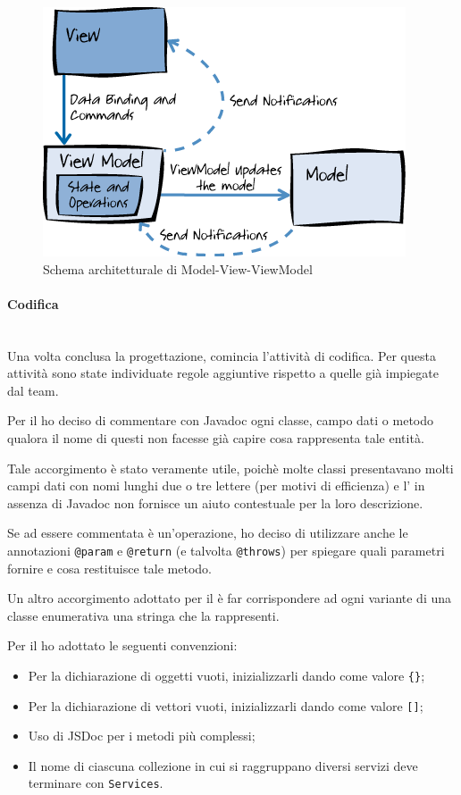 \begin{figure}[H]%
\centering
\includegraphics[width=.7\columnwidth]{immagini/mvvm}
\caption{Schema architetturale di Model-View-ViewModel}
\label{fig:mvvm}%
\end{figure}

\paragraph{Codifica} \mbox{} \\

Una volta conclusa la progettazione, comincia l'attività di codifica. Per
questa attività sono state individuate regole aggiuntive rispetto a quelle già
impiegate dal team.

Per il \BKEND{} ho deciso di commentare con Javadoc ogni classe, campo dati o
metodo qualora il nome di questi non facesse già capire cosa rappresenta tale
entità.

Tale accorgimento è stato veramente utile, poichè molte classi presentavano
molti campi dati con nomi lunghi due o tre lettere (per motivi di efficienza)
e l' in assenza di Javadoc non fornisce un aiuto contestuale per la
loro descrizione.

Se ad essere commentata è un'operazione, ho deciso di utilizzare anche le
annotazioni \texttt{@param} e \texttt{@return} (e talvolta \texttt{@throws})
per spiegare quali parametri fornire e cosa restituisce tale metodo.

Un altro accorgimento adottato per il \BKEND{} è far corrispondere ad ogni
variante di una classe enumerativa una stringa che la rappresenti.

Per il \FREND{} ho adottato le seguenti convenzioni:

\begin{itemize}
\item Per la dichiarazione di oggetti vuoti, inizializzarli dando come valore
  \texttt{\{\}};
\item Per la dichiarazione di vettori vuoti, inizializzarli dando come valore
  \texttt{[]};
\item Uso di JSDoc per i metodi più complessi;
\item Il nome di ciascuna collezione in cui si raggruppano diversi servizi
  deve terminare con \texttt{Services}.
\end{itemize}

